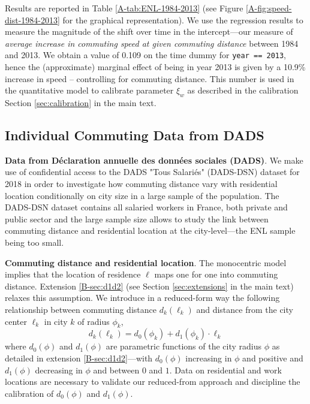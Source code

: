 \documentclass[11pt]{report}
\begin{document}
Results are reported in Table \ref{A-tab:ENL-1984-2013} (see Figure \ref{A-fig:speed-dist-1984-2013} for the graphical representation). We use the regression results to measure the magnitude of the shift over time in the intercept---our measure of \emph{average increase in commuting speed at given commuting distance} between 1984 and 2013. We obtain a value of
0.109 on the time dummy for \texttt{year == 2013}, hence the (approximate) 
marginal effect of being in year 2013 is given by a 10.9\% increase in 
speed -- controlling for commuting distance. This number is used in the quantitative model to calibrate 
parameter $\xi_w$ as described in the calibration Section \ref{sec:calibration} in the main text.


\subsection{Individual Commuting Data from DADS}\label{A-sec:DADS}

\noindent \textbf{Data from Déclaration annuelle des données sociales (DADS)}. We make use of confidential access to the DADS "Tous Salari\'es" (DADS-DSN) dataset for 2018 in order to investigate how commuting distance vary with residential location conditionally on city size in a large sample of the population. The DADS-DSN dataset contains all salaried workers in France, both private and public sector and the large sample size allows to study the link between commuting distance and residential location at the city-level---the ENL sample being too small.

\noindent \textbf{Commuting distance and residential location}. The monocentric model implies that the location of residence $\ell$ maps one for one into commuting distance. Extension \ref{B-sec:d1d2} (see Section \ref{sec:extensions} in the main text) relaxes this assumption. We introduce in a reduced-form way the following relationship between commuting distance $d_k(\ell_k)$ and distance from the city center $\ell_k$ in city $k$ of radius $\phi_k$,
\begin{equation}
d_k(\ell_k) = d_0(\phi_k) + d_1(\phi_k) \cdot \ell_k \label{A-eq:d1d2-model}
\end{equation}
where $d_0(\phi)$ and $d_1(\phi)$ are parametric functions of the city radius $\phi$ as detailed in extension \ref{B-sec:d1d2}---with $d_0(\phi)$ increasing in $\phi$ and positive and $d_1(\phi)$ decreasing in $\phi$ and between $0$ and $1$. Data on residential and work locations are necessary to validate our reduced-from approach and discipline the calibration of $d_0(\phi)$ and $d_1(\phi)$. 
\end{document}
